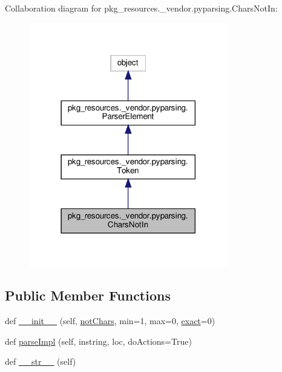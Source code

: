 Collaboration diagram for pkg\+\_\+resources.\+\_\+vendor.\+pyparsing.\+Chars\+Not\+In\+:
\nopagebreak
\begin{figure}[H]
\begin{center}
\leavevmode
\includegraphics[width=246pt]{classpkg__resources_1_1__vendor_1_1pyparsing_1_1CharsNotIn__coll__graph}
\end{center}
\end{figure}
\subsection*{Public Member Functions}
\begin{DoxyCompactItemize}
\item 
def \hyperlink{classpkg__resources_1_1__vendor_1_1pyparsing_1_1CharsNotIn_a53d43d0d66a157f1d1429421384e148e}{\+\_\+\+\_\+init\+\_\+\+\_\+} (self, \hyperlink{classpkg__resources_1_1__vendor_1_1pyparsing_1_1CharsNotIn_a34bbce664208b0ccb30cfec5a3d19dcb}{not\+Chars}, min=1, max=0, \hyperlink{namespacepkg__resources_1_1__vendor_1_1pyparsing_ae9d6f7275e1682d3bbe5f644beec6b8e}{exact}=0)
\item 
def \hyperlink{classpkg__resources_1_1__vendor_1_1pyparsing_1_1CharsNotIn_a6aac95868d806bed5aefddeec62c8f95}{parse\+Impl} (self, instring, loc, do\+Actions=True)
\item 
def \hyperlink{classpkg__resources_1_1__vendor_1_1pyparsing_1_1CharsNotIn_a1d14d1f8326ba197eeaf6c27040c8ced}{\+\_\+\+\_\+str\+\_\+\+\_\+} (self)
\end{DoxyCompactItemize}
